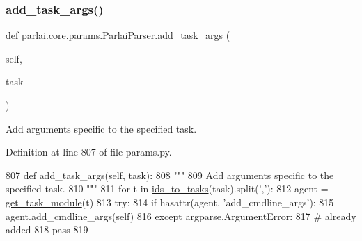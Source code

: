 \mbox{\label{classparlai_1_1core_1_1params_1_1ParlaiParser_a61ff766a70bd11365cbcbf71431ce527}} 
\subsubsection{\texorpdfstring{add\+\_\+task\+\_\+args()}{add\_task\_args()}}
{\footnotesize\ttfamily def parlai.\+core.\+params.\+Parlai\+Parser.\+add\+\_\+task\+\_\+args (\begin{DoxyParamCaption}\item[{}]{self,  }\item[{}]{task }\end{DoxyParamCaption})}

\begin{DoxyVerb}Add arguments specific to the specified task.
\end{DoxyVerb}
 

Definition at line 807 of file params.\+py.


\begin{DoxyCode}
807     \textcolor{keyword}{def }add\_task\_args(self, task):
808         \textcolor{stringliteral}{"""}
809 \textcolor{stringliteral}{        Add arguments specific to the specified task.}
810 \textcolor{stringliteral}{        """}
811         \textcolor{keywordflow}{for} t \textcolor{keywordflow}{in} \hyperlink{namespaceparlai_1_1tasks_1_1tasks_ad536d1295ca5ba2ecf3a48635b482087}{ids\_to\_tasks}(task).split(\textcolor{stringliteral}{','}):
812             agent = \hyperlink{namespaceparlai_1_1core_1_1agents_a530b987b67a802a8e9c5fa3c24ae942f}{get\_task\_module}(t)
813             \textcolor{keywordflow}{try}:
814                 \textcolor{keywordflow}{if} hasattr(agent, \textcolor{stringliteral}{'add\_cmdline\_args'}):
815                     agent.add\_cmdline\_args(self)
816             \textcolor{keywordflow}{except} argparse.ArgumentError:
817                 \textcolor{comment}{# already added}
818                 \textcolor{keywordflow}{pass}
819 
\end{DoxyCode}
\mbox{\label{classparlai_1_1core_1_1params_1_1ParlaiParser_a72da297485838e9633cb0fc86d177cf8}} 
